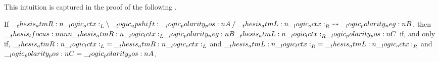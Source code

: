 This intuition is captured in the proof of the following .
\begin{lemma}\label{lem:qimp-correct}
  If $\qimp{\atmR{\octx}_L}{\up \p{A}}{\atmL{\octx}_R}{\n{B}}$, then $\lfocus{\atmR{\lctx}_L}{\n{B}}{\atmL{\lctx}_R}{\p{C}}$ if, and only if, $\atmR{\lctx}_L = \atmR{\octx}_L$ and $\atmL{\lctx}_R = \atmL{\octx}_R$ and $\p{C} = \p{A}$.
\end{lemma}
